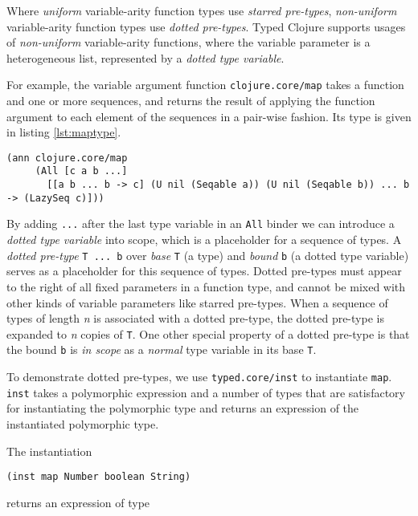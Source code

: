 Where \emph{uniform} variable-arity function types use \emph{starred pre-types}, \emph{non-uniform}
variable-arity function types use \emph{dotted pre-types}.
Typed Clojure supports usages of \emph{non-uniform} variable-arity functions,
where the variable parameter is a heterogeneous list, represented by a \emph{dotted type variable}.

For example, the variable argument function \lstinline|clojure.core/map| takes a function and one or more sequences,
and returns the result of applying the function argument to each element of the sequences in a pair-wise fashion.
Its type is given in listing \ref{lst:maptype}.

\begin{lstlisting}[caption=Type signature for \lstinline|clojure.core/map|, label=lst:maptype]
(ann clojure.core/map
     (All [c a b ...]
       [[a b ... b -> c] (U nil (Seqable a)) (U nil (Seqable b)) ... b -> (LazySeq c)]))
\end{lstlisting}

By adding \lstinline|...| after the last type variable in an \lstinline|All| binder
we can introduce a \emph{dotted type variable} into scope, which is a placeholder for a sequence of types.
A \emph{dotted pre-type} \lstinline|T ... b| over \emph{base} \lstinline|T| (a type) and \emph{bound}
\lstinline|b| (a dotted type variable)
serves as a placeholder for this sequence of types.
Dotted pre-types must appear to the right of all fixed parameters in a function type,
and cannot be mixed with other kinds of variable parameters like starred pre-types.
When a sequence of types of length \emph{n} is associated with a dotted pre-type, 
the dotted pre-type is expanded to \emph{n} copies of \lstinline|T|.
One other special property of a dotted pre-type is that the bound \lstinline|b|
is \emph{in scope} as a \emph{normal} type variable in its base \lstinline|T|.

To demonstrate dotted pre-types, we use \lstinline|typed.core/inst| to instantiate
\lstinline|map|. \lstinline|inst| takes a polymorphic expression and a number of types
that are satisfactory for instantiating the polymorphic type and returns an expression
of the instantiated polymorphic type.

The instantiation

\begin{lstlisting}
(inst map Number boolean String)
\end{lstlisting}

returns an expression of type

